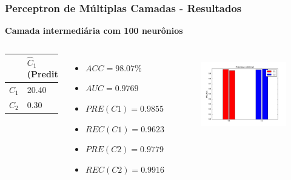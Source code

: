 \documentclass{beamer}
\begin{document}
\begin{frame}
\frametitle{Perceptron de Múltiplas Camadas - Resultados}
\textbf{Camada intermediária com 100 neurônios}
\begin{columns}[c] 
\begin{table}
\begin{tabular}{l l l}
\toprule
 & \textbf{$\hat{C}_1$ (Predita)} & \textbf{$\hat{C}_2$(Predita)}\\
\midrule
$C_1$ & 20.40 & 0.80 \\
$C_2$ & 0.30  & 35.40\\ 
\bottomrule
\end{tabular}
\begin{itemize}
\item $ACC = 98.07 \%$
\item $AUC = 0.9769  $
\item $PRE(C1) = 0.9855$
\item $REC(C1) = 0.9623$
\item $PRE(C2) = 0.9779$
\item $REC(C2) = 0.9916$
\end{itemize}
\end{table}

\begin{figure}[H]
\centering
  \includegraphics[width=\linewidth]{../img/mlp_100.png}
  \label{fig:percep}
\end{figure}%

\end{columns}
\end{frame}
\end{document}
